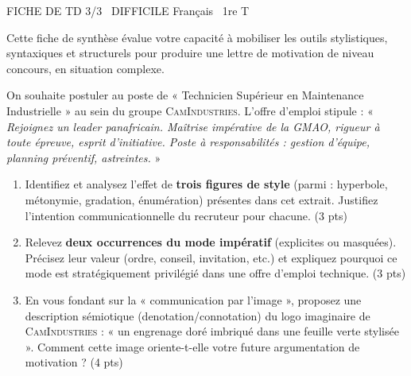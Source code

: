 \documentclass[11pt]{article}
\begin{document}
\begin{tcolorbox}[enhanced,colback=popink,colframe=popink,arc=10pt,boxrule=0pt,left=12pt,right=12pt,top=9pt,bottom=9pt]
{\color{white}\popxbold\small FICHE DE TD 3/3 \textbullet\ DIFFICILE \hfill Français \textbullet\ 1re T\par}
\end{tcolorbox}
\vspace{4pt}
\noindent Cette fiche de synthèse évalue votre capacité à mobiliser les outils stylistiques, syntaxiques et structurels pour produire une lettre de motivation de niveau concours, en situation complexe.

\begin{exercice}
On souhaite postuler au poste de « Technicien Supérieur en Maintenance Industrielle » au sein du groupe \textsc{CamIndustries}. L'offre d'emploi stipule : « \textit{Rejoignez un leader panafricain. Maîtrise impérative de la GMAO, rigueur à toute épreuve, esprit d'initiative. Poste à responsabilités : gestion d'équipe, planning préventif, astreintes. }»
\begin{enumerate}
    \item Identifiez et analysez l'effet de \textbf{trois figures de style} (parmi : hyperbole, métonymie, gradation, énumération) présentes dans cet extrait. Justifiez l'intention communicationnelle du recruteur pour chacune. (3 pts)
    \item Relevez \textbf{deux occurrences du mode impératif} (explicites ou masquées). Précisez leur valeur (ordre, conseil, invitation, etc.) et expliquez pourquoi ce mode est stratégiquement privilégié dans une offre d'emploi technique. (3 pts)
    \item En vous fondant sur la « communication par l'image », proposez une description sémiotique (denotation/connotation) du logo imaginaire de \textsc{CamIndustries} : « un engrenage doré imbriqué dans une feuille verte stylisée ». Comment cette image oriente-t-elle votre future argumentation de motivation ? (4 pts)
\end{enumerate}
\end{exercice}
\end{document}
